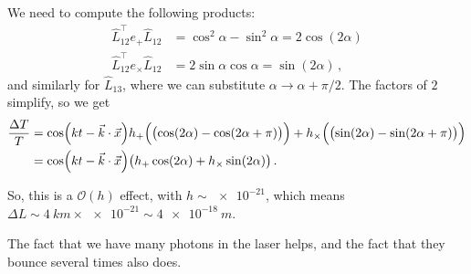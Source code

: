 \documentclass[main.tex]{subfiles}
\begin{document}
We need to compute the following products: 
%
\begin{align}
\hat{L}_{12}^{\top} e_{+} \hat{L}_{12} &= \cos^2\alpha - \sin^2\alpha =  2\cos(2 \alpha )
\\
\hat{L}_{12}^{\top} e_{ \times } \hat{L}_{12} &= 2 \sin \alpha \cos \alpha = \sin(2 \alpha )
\,,
\end{align}
%
and similarly for \(\hat{L}_{13} \), where we can substitute \(\alpha \rightarrow \alpha + \pi /2\). The factors of \(2\) simplify, so we get 
%
\begin{align}
\frac{\Delta T}{T} &= \cos(kt - \vec{k} \cdot \vec{x}) 
h_{+}\qty(  \qty(\cos(2 \alpha ) - \cos(2 \alpha  + \pi ))) + 
h_{ \times } \qty(  \qty(\sin(2 \alpha ) - \sin(2 \alpha  + \pi )))  \\
&= \cos(kt - \vec{k} \cdot \vec{x}) \qty(
h_{+}\cos(2 \alpha ) + 
h_{\times} \sin(2 \alpha ))
\,.
\end{align}

So, this is a \(\mathcal{O}(h)\) effect, with \(h \sim \num{e-21}\), which means \(\Delta L  \sim \SI{4}{km} \times \num{e-21} \sim \SI{4e-18}{m}\). 

The fact that we have many photons in the laser helps, and the fact that they bounce several times also does. 

\end{document}

